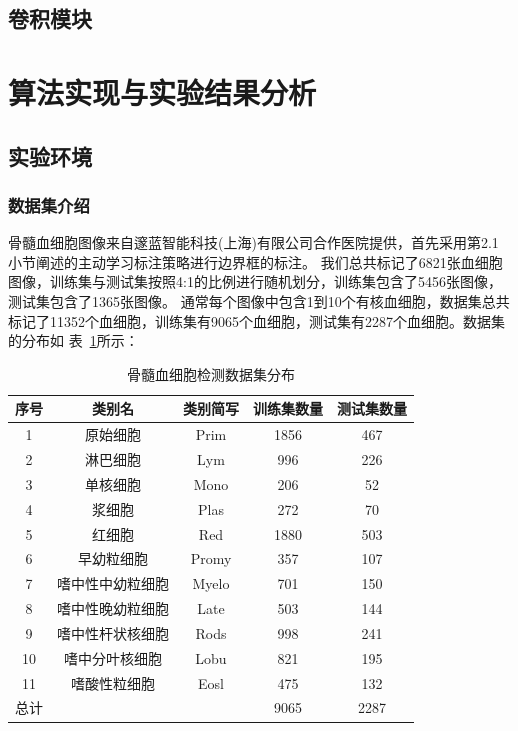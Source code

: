 \subsection{卷积模块}
\section{算法实现与实验结果分析}
\subsection{实验环境}

\subsubsection{数据集介绍}

骨髓血细胞图像来自邃蓝智能科技(上海)有限公司合作医院提供，首先采用第2.1小节阐述的主动学习标注策略进行边界框的标注。
我们总共标记了6821张血细胞图像，训练集与测试集按照4:1的比例进行随机划分，训练集包含了5456张图像，测试集包含了1365张图像。
通常每个图像中包含1到10个有核血细胞，数据集总共标记了11352个血细胞，训练集有9065个血细胞，测试集有2287个血细胞。数据集的分布如
表~\ref{table:cell_detect}所示：

\begin{table}
  \caption{骨髓血细胞检测数据集分布}   
  \centering 
  \label{table:cell_detect}
  \begin{tabular}{ccccc}
    \toprule[2pt]
    序号 & 类别名  &  类别简写 & 训练集数量 & 测试集数量 \\
    \midrule[1.5pt] 
    1 & 原始细胞 & Prim & 1856 & 467 \\ 
    2 & 淋巴细胞 & Lym & 996 & 226   \\ 
    3 & 单核细胞 & Mono & 206 & 52   \\ 
    4 & 浆细胞 & Plas & 272 & 70   \\ 
    5 & 红细胞 & Red & 1880 & 503   \\ 
    6 & 早幼粒细胞 & Promy & 357 & 107   \\ 
    7 & 嗜中性中幼粒细胞 & Myelo & 701 & 150   \\ 
    8 & 嗜中性晚幼粒细胞 & Late & 503 & 144   \\ 
    9 & 嗜中性杆状核细胞 & Rods & 998 & 241   \\  
    10 & 嗜中分叶核细胞 & Lobu & 821 & 195   \\  
    11 & 嗜酸性粒细胞 & Eosl & 475 & 132   \\  
    \hline
    总计 &   &   & 9065 & 2287 \\
    \bottomrule[2pt]      
  \end{tabular} 
\end{table}


